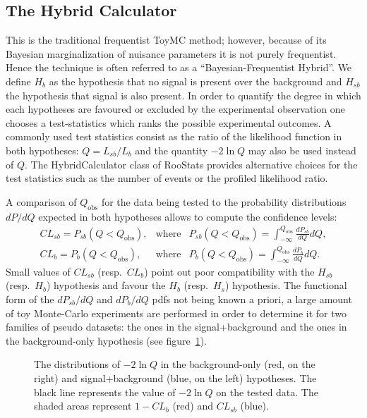\documentclass[11pt]{article}
\begin{document}
\subsection{The Hybrid Calculator}

This is the traditional frequentist ToyMC method; however, because of
its Bayesian marginalization of nuisance parameters it is not purely
frequentist.  Hence the technique is often referred to as a
``Bayesian-Frequentist Hybrid''.
 We define $H_b$ as the hypothesis that no signal is
present over the background and $H_{sb}$ the hypothesis that signal is
also present. In order to quantify the degree in which each hypotheses
are favoured or excluded by the experimental observation one chooses a
test-statistics which ranks the possible experimental outcomes. A
commonly used test statistics consist as the ratio of the likelihood
function in both hypotheses: $Q=L_{sb}/L_b$ and the quantity $-2\ln Q$
may also be used instead of $Q$. The HybridCalculator class of RooStats provides alternative
choices for the test statistics such as the number of events or the
profiled likelihood ratio.


A comparison of $Q_\mathrm{obs}$ for the data being tested to the
probability distributions $dP/dQ$ expected in both hypotheses allows
to compute the confidence levels:
\begin{eqnarray}
  CL_{sb} = P_{sb}(Q<Q_\mathrm{obs}), & \mathrm{where} & P_{sb}(Q<Q_\mathrm{obs}) = \int_{-\infty}^{Q_\mathrm{obs}}\frac{dP_{sb}}{dQ} dQ, \\
  CL_{b} = P_{b}(Q<Q_\mathrm{obs}), & \mathrm{where} & P_{b}(Q<Q_\mathrm{obs}) = \int_{-\infty}^{Q_\mathrm{obs}}\frac{dP_{b}}{dQ} dQ.
\end{eqnarray}
Small values of $CL_{sb}$ (resp.~$CL_{b}$) point out poor compatibility with the $H_{sb}$ (resp.~$H_{b}$)
hypothesis and favour the $H_{b}$ (resp.~$H_{s}$) hypothesis.
The functional form of the $dP_{sb}/dQ$ and $dP_{b}/dQ$ pdfs not being
known a priori, a large amount of toy Monte-Carlo experiments are performed
in order to determine it for
two families of pseudo datasets: the ones in the signal+background and the ones in the background-only hypothesis (see figure~\ref{m2lnQ}).


\begin{figure}[h]
    \begin{center}
        \caption{The distributions of $-2\ln Q$ in the background-only
                 (red, on the right) and signal+background (blue,
                 on the left) hypotheses. The black line represents
                 the value of $-2\ln Q$ on the tested data.  The
                 shaded areas represent $1-CL_{b}$ (red) and $CL_{sb}$
                 (blue).\label{m2lnQ}}
    \end{center}
\end{figure}
\end{document}
